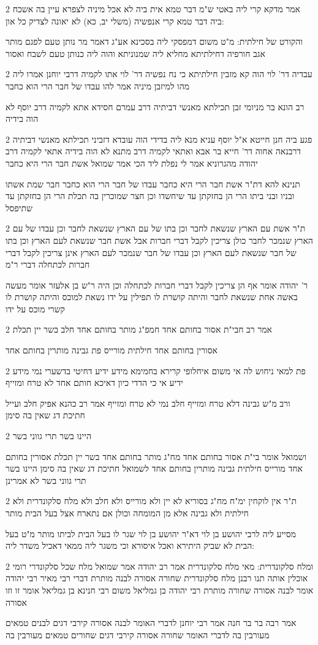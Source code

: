 \documentclass[12pt, openany]{book}
\newcommand{\sethebfont}{
\fontsize{10.5pt}{21.0pt} \selectfont
}
\newcommand{\twocol}[1]{
	{\sethebfont \begin{multicols}{2}
			#1
	\end{multicols}}	
}
\begin{document}
\twocol{אמר מדקא קרי ליה באטי ש"מ דבר טמא אית ביה לא אכל מיניה לצפרא עיין בה אשכח ביה דבר טמא קרי אנפשיה (משלי יב, כא) לא יאונה לצדיק כל און:
\par והקורט של חילתית: מ"ט משום דמפסקי ליה בסכינא אע"ג דאמר מר נותן טעם לפגם מותר אגב חורפיה דחילתיתא מחליא ליה שמנוניתא והוה ליה כנותן טעם לשבח ואסור}
\twocol{עבדיה דר' לוי הוה קא מזבין חילתיתא כי נח נפשיה דר' לוי אתו לקמיה דרבי יוחנן אמרו ליה מהו למיזבן מיניה אמר להו עבדו של חבר הרי הוא כחבר
\par רב הונא בר מניומי זבן תכילתא מאנשי דביתיה דרב עמרם חסידא אתא לקמיה דרב יוסף לא הוה בידיה}
\twocol{פגע ביה חנן חייטא א"ל יוסף עניא מנא ליה בדידי הוה עובדא דזביני תכילתא מאנשי דביתיה דרבנאה אחוה דר' חייא בר אבא ואתאי לקמיה דרב מתנא לא הוה בידיה אתאי לקמיה דרב יהודה מהגרוניא אמר לי נפלת ליד הכי אמר שמואל אשת חבר הרי היא כחבר
\par תנינא להא דת"ר אשת חבר הרי היא כחבר עבדו של חבר הרי הוא כחבר חבר שמת אשתו ובניו ובני ביתו הרי הן בחזקתן עד שיחשדו וכן חצר שמוכרין בה תכלת הרי הן בחזקתן עד שתיפסל}
\twocol{ת"ר אשת עם הארץ שנשאת לחבר וכן בתו של עם הארץ שנשאת לחבר וכן עבדו של עם הארץ שנמכר לחבר כולן צריכין לקבל דברי חברות אבל אשת חבר שנשאת לעם הארץ וכן בתו של חבר שנשאת לעם הארץ וכן עבדו של חבר שנמכר לעם הארץ אינן צריכין לקבל דברי חברות לכתחלה דברי ר"מ
\par ר' יהודה אומר אף הן צריכין לקבל דברי חברות לכתחלה וכן היה ר"ש בן אלעזר אומר מעשה באשה אחת שנשאת לחבר והיתה קושרת לו תפילין על ידו נשאת למוכס והיתה קושרת לו קשרי מוכס על ידו}
\twocol{אמר רב חבי"ת אסור בחותם אחד חמפ"ג מותר בחותם אחד חלב בשר יין תכלת
\par אסורין בחותם אחד חילתית מורייס פת גבינה מותרין בחותם אחד}
\twocol{פת למאי ניחוש לה אי משום איחלופי קרירא בחמימא מידע ידיע דחיטי בדשערי נמי מידע ידיע אי כי הדדי כיון דאיכא חותם אחד לא טרח ומזייף
\par ורב מ"ש גבינה דלא טרח ומזייף חלב נמי לא טרח ומזייף אמר רב כהנא אפיק חלב ועייל חתיכת דג שאין בה סימן}
\twocol{היינו בשר תרי גווני בשר
\par ושמואל אומר בי"ת אסור בחותם אחד מח"ג מותר בחותם אחד בשר יין תכלת אסורין בחותם אחד מורייס חילתית גבינה מותרין בחותם אחד לשמואל חתיכת דג שאין בה סימן היינו בשר תרי גווני בשר לא אמרינן}
\twocol{ת"ר אין לוקחין ימ"ח מח"ג בסוריא לא יין ולא מורייס ולא חלב ולא מלח סלקונדרית ולא חילתית ולא גבינה אלא מן המומחה וכולן אם נתארח אצל בעל הבית מותר
\par מסייע ליה לרבי יהושע בן לוי דא"ר יהושע בן לוי שגר לו בעל הבית לביתו מותר מ"ט בעל הבית לא שביק היתירא ואכל איסורא וכי משגר ליה ממאי דאכיל משדר ליה:}
\twocol{ומלח סלקונדרית: מאי מלח סלקונדרית אמר רב יהודה אמר שמואל מלח שכל סלקונדרי רומי אוכלין אותה תנו רבנן מלח סלקונדרית שחורה אסורה לבנה מותרת דברי רבי מאיר רבי יהודה אומר לבנה אסורה שחורה מותרת רבי יהודה בן גמליאל משום רבי חנינא בן גמליאל אומר זו וזו אסורה
\par אמר רבה בר בר חנה אמר רבי יוחנן לדברי האומר לבנה אסורה קירבי דגים לבנים טמאים מעורבין בה לדברי האומר שחורה אסורה קירבי דגים שחורים טמאים מעורבין בה}
\end{document}
